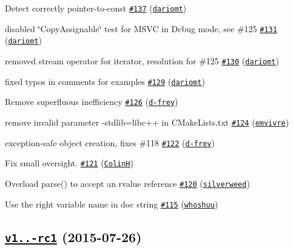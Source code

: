 \begin{DoxyItemize}
\item Detect correctly pointer-\/to-\/const \href{https://github.com/nlohmann/json/pull/137}{\tt \#137} (\href{https://github.com/dariomt}{\tt dariomt})
\item disabled \char`\"{}\+Copy\+Assignable\char`\"{} test for M\+S\+VC in Debug mode, see \#125 \href{https://github.com/nlohmann/json/pull/131}{\tt \#131} (\href{https://github.com/dariomt}{\tt dariomt})
\item removed stream operator for iterator, resolution for \#125 \href{https://github.com/nlohmann/json/pull/130}{\tt \#130} (\href{https://github.com/dariomt}{\tt dariomt})
\item fixed typos in comments for examples \href{https://github.com/nlohmann/json/pull/129}{\tt \#129} (\href{https://github.com/dariomt}{\tt dariomt})
\item Remove superfluous inefficiency \href{https://github.com/nlohmann/json/pull/126}{\tt \#126} (\href{https://github.com/d-frey}{\tt d-\/frey})
\item remove invalid parameter \textquotesingle{}-\/stdlib=libc++\textquotesingle{} in C\+Make\+Lists.\+txt \href{https://github.com/nlohmann/json/pull/124}{\tt \#124} (\href{https://github.com/emvivre}{\tt emvivre})
\item exception-\/safe object creation, fixes \#118 \href{https://github.com/nlohmann/json/pull/122}{\tt \#122} (\href{https://github.com/d-frey}{\tt d-\/frey})
\item Fix small oversight. \href{https://github.com/nlohmann/json/pull/121}{\tt \#121} (\href{https://github.com/ColinH}{\tt ColinH})
\item Overload parse() to accept an rvalue reference \href{https://github.com/nlohmann/json/pull/120}{\tt \#120} (\href{https://github.com/silverweed}{\tt silverweed})
\item Use the right variable name in doc string \href{https://github.com/nlohmann/json/pull/115}{\tt \#115} (\href{https://github.com/whoshuu}{\tt whoshuu})
\end{DoxyItemize}

\subsection*{\href{https://github.com/nlohmann/json/releases/tag/v1.0.0-rc1}{\tt v1..-\/rc1} (2015-\/07-\/26)}


